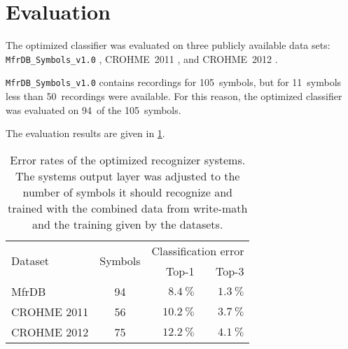 
\section{Evaluation}

The optimized classifier was evaluated on three publicly available data sets:
\verb+MfrDB_Symbols_v1.0+ \cite{Stria2012}, CROHME~2011 \cite{Mouchere2011},
and CROHME~2012 \cite{Mouchere2012}.

\verb+MfrDB_Symbols_v1.0+ contains recordings for 105~symbols, but for
11~symbols less than 50~recordings were available. For this reason, the
optimized classifier was evaluated on 94~of the 105~symbols.

The evaluation results are given in \cref{table:public-eval-results}.

\begin{table}[htb]
    \centering
    \begin{tabular}{lcrr}
    \toprule
    \multirow{2}{*}{Dataset}  & \multirow{2}{*}{Symbols}  & \multicolumn{2}{c}{Classification error}\\
    \cmidrule(l){3-4}
              & & Top-1                 & Top-3                \\\midrule
    MfrDB       & 94 & $\SI{8.4}{\percent}$  & $\SI{1.3}{\percent}$ \\
    CROHME 2011 & 56 & $\SI{10.2}{\percent}$ & $\SI{3.7}{\percent}$ \\
    CROHME 2012 & 75 & $\SI{12.2}{\percent}$ & $\SI{4.1}{\percent}$ \\
    \bottomrule
    \end{tabular}
    \caption{Error rates of the optimized recognizer systems. The systems
             output layer was adjusted to the number of symbols it should
             recognize and trained with the combined data from
             write-math and the training given by the datasets.}
\label{table:public-eval-results}
\end{table}